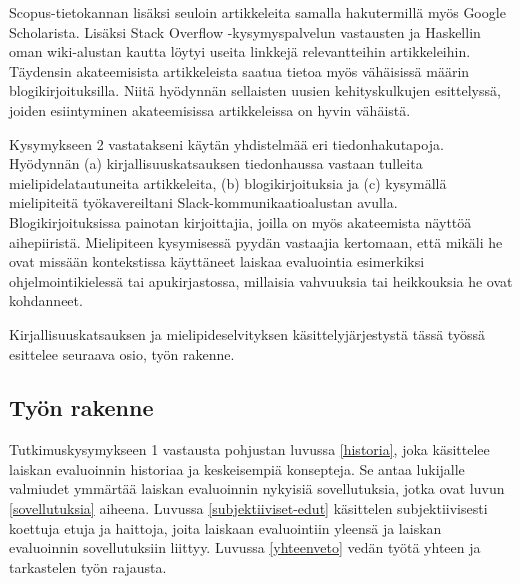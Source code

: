 Scopus-tietokannan lisäksi seuloin artikkeleita samalla hakutermillä myös Google Scholarista. Lisäksi Stack Overflow -kysymyspalvelun vastausten ja Haskellin oman wiki-alustan kautta löytyi useita linkkejä relevantteihin artikkeleihin. Täydensin akateemisista artikkeleista saatua tietoa myös vähäisissä määrin blogikirjoituksilla. Niitä hyödynnän sellaisten uusien kehityskulkujen esittelyssä, joiden esiintyminen akateemisissa artikkeleissa on hyvin vähäistä.

\begin{sloppypar}
Kysymykseen 2 vastatakseni käytän yhdistelmää eri tiedonhakutapoja. Hyödynnän (a) kirjallisuuskatsauksen tiedonhaussa vastaan tulleita mielipidelatautuneita artikkeleita, (b) blogikirjoituksia ja (c) kysymällä mielipiteitä työkavereiltani Slack-kommunikaatioalustan avulla. Blogikirjoituksissa painotan kirjoittajia, joilla on myös akateemista näyttöä aihepiiristä. Mielipiteen kysymisessä pyydän vastaajia kertomaan, että mikäli he ovat missään kontekstissa käyttäneet laiskaa evaluointia esimerkiksi ohjelmointikielessä tai apukirjastossa, millaisia vahvuuksia tai heikkouksia he ovat kohdanneet.
\end{sloppypar}

Kirjallisuuskatsauksen ja mielipideselvityksen käsittelyjärjestystä tässä työssä esittelee seuraava osio, työn rakenne.

\subsection{Työn rakenne}

Tutkimuskysymykseen 1 vastausta pohjustan luvussa \ref{historia}, joka käsittelee laiskan evaluoinnin historiaa ja keskeisempiä konsepteja. Se antaa lukijalle valmiudet ymmärtää laiskan evaluoinnin nykyisiä sovellutuksia, jotka ovat luvun \ref{sovellutuksia} aiheena. Luvussa \ref{subjektiiviset-edut} käsittelen subjektiivisesti koettuja etuja ja haittoja, joita laiskaan evaluointiin yleensä ja laiskan evaluoinnin sovellutuksiin liittyy. Luvussa \ref{yhteenveto} vedän työtä yhteen ja tarkastelen työn rajausta.
